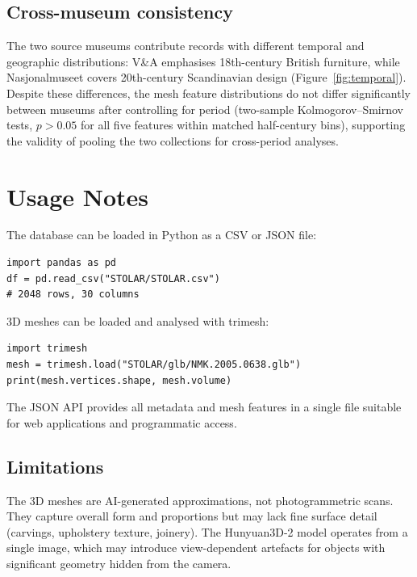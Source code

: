 \subsection{Cross-museum consistency}

The two source museums contribute records with different
temporal and geographic distributions:
V\&A emphasises 18th-century British furniture,
while Nasjonalmuseet covers 20th-century Scandinavian design (Figure~\ref{fig:temporal}).
Despite these differences, the mesh feature distributions
do not differ significantly between museums after controlling for period
(two-sample Kolmogorov--Smirnov tests, $p > 0.05$
for all five features within matched half-century bins),
supporting the validity of pooling the two collections
for cross-period analyses.


\section{Usage Notes}

The database can be loaded in Python as a CSV or JSON file:

{\small
\begin{verbatim}
import pandas as pd
df = pd.read_csv("STOLAR/STOLAR.csv")
# 2048 rows, 30 columns
\end{verbatim}
}

\noindent 3D meshes can be loaded and analysed with trimesh:

{\small
\begin{verbatim}
import trimesh
mesh = trimesh.load("STOLAR/glb/NMK.2005.0638.glb")
print(mesh.vertices.shape, mesh.volume)
\end{verbatim}
}

\noindent The JSON API provides all metadata and mesh features in a single file suitable for web applications and programmatic access.

\subsection{Limitations}

The 3D meshes are AI-generated approximations, not photogrammetric scans.
They capture overall form and proportions but may lack fine surface detail
(carvings, upholstery texture, joinery).
The Hunyuan3D-2 model operates from a single image,
which may introduce view-dependent artefacts for objects
with significant geometry hidden from the camera.

